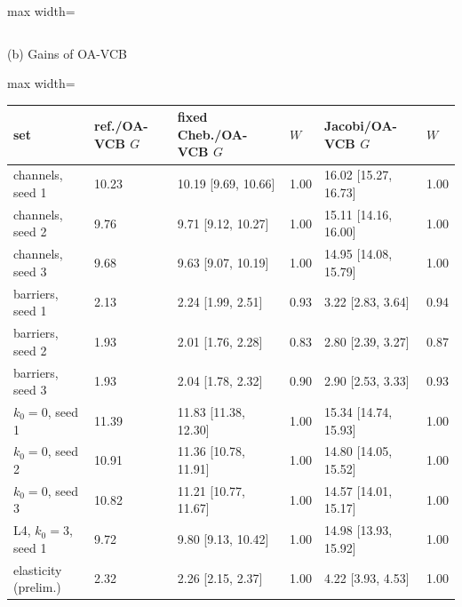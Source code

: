\begin{table}[tbp]
\begin{adjustbox}{max width=\linewidth}
\begin{tabular}{lllllll}
\bottomrule\end{tabular}
\end{adjustbox}
\par\medskip
{\small (b) Gains of OA-VCB}\par\smallskip
\begin{adjustbox}{max width=\linewidth}
\begin{tabular}{llllll}\toprule
set & ref./OA-VCB $G$ & fixed Cheb./OA-VCB $G$ & $W$ & Jacobi/OA-VCB $G$ & $W$ \\\midrule
channels, seed 1 & 10.23 & 10.19 [9.69, 10.66] & 1.00 & 16.02 [15.27, 16.73] & 1.00 \\
channels, seed 2 & 9.76 & 9.71 [9.12, 10.27] & 1.00 & 15.11 [14.16, 16.00] & 1.00 \\
channels, seed 3 & 9.68 & 9.63 [9.07, 10.19] & 1.00 & 14.95 [14.08, 15.79] & 1.00 \\
barriers, seed 1 & 2.13 & 2.24 [1.99, 2.51] & 0.93 & 3.22 [2.83, 3.64] & 0.94 \\
barriers, seed 2 & 1.93 & 2.01 [1.76, 2.28] & 0.83 & 2.80 [2.39, 3.27] & 0.87 \\
barriers, seed 3 & 1.93 & 2.04 [1.78, 2.32] & 0.90 & 2.90 [2.53, 3.33] & 0.93 \\
$k_0=0$, seed 1 & 11.39 & 11.83 [11.38, 12.30] & 1.00 & 15.34 [14.74, 15.93] & 1.00 \\
$k_0=0$, seed 2 & 10.91 & 11.36 [10.78, 11.91] & 1.00 & 14.80 [14.05, 15.52] & 1.00 \\
$k_0=0$, seed 3 & 10.82 & 11.21 [10.77, 11.67] & 1.00 & 14.57 [14.01, 15.17] & 1.00 \\
L4, $k_0=3$, seed 1 & 9.72 & 9.80 [9.13, 10.42] & 1.00 & 14.98 [13.93, 15.92] & 1.00 \\
elasticity (prelim.) & 2.32 & 2.26 [2.15, 2.37] & 1.00 & 4.22 [3.93, 4.53] & 1.00 \\
\bottomrule\end{tabular}
\end{adjustbox}
\end{table}

